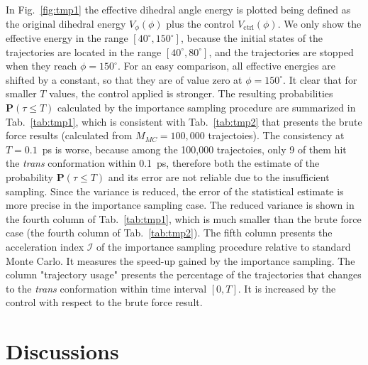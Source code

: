 \documentclass[final]{siamltex}
\newcommand{\cI}{{\mathcal I}}
\newcommand{\bP}{{\mathbf P}}
\begin{document}
In Fig.~\ref{fig:tmp1} the effective dihedral angle energy is plotted being defined as the original dihedral energy $V_\phi(\phi)$ plus the control
$V_{\textrm{ctrl}}(\phi)$. We only show the effective energy in the
range $[40^\circ, 150^\circ]$, because the initial states of the trajectories are located in the range $[40^\circ, 80^\circ]$, and the
trajectories are stopped when they reach $\phi = 150^\circ$. For an easy
comparison, all effective energies are shifted by a constant, so that
they are of  value zero at $\phi = 150^\circ$. It clear that for
smaller $T$ values, the control applied is stronger.  The
resulting probabilities $\bP (\tau \leq T)$ calculated by the
importance sampling procedure are summarized in Tab.~\ref{tab:tmp1},
which is consistent with Tab.~\ref{tab:tmp2} that presents the
brute force results (calculated from $M_{MC}=100,000$ trajectoies).
The consistency at $T = 0.1$~ps is worse, because
among the 100,000 trajectoies, only 9 of them hit the \emph{trans}
conformation within 0.1~ps, therefore both the estimate of the probability
$\bP (\tau \leq T)$ and its error are not reliable due to the
insufficient sampling.
Since the variance is reduced, the error of the
statistical estimate is more precise in the importance sampling case. The
reduced variance is shown in the fourth column of Tab.~\ref{tab:tmp1},
which is much smaller than the brute force case (the fourth column of
Tab.~\ref{tab:tmp2}). The fifth column presents the acceleration index $\cI$
of the importance sampling procedure relative to standard Monte Carlo. It measures the speed-up gained by the
importance sampling. The column "trajectory usage"
presents the percentage of the trajectories that changes to the \emph{trans}
conformation within time interval $[0, T]$. It is increased by
the control with respect to the brute force result.




\section{Discussions}
\label{sec-discuss}
\end{document}
